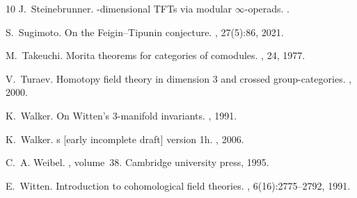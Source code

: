 \documentclass[reqno]{amsart}
\theoremstyle{definition}
\renewcommand{\1}{\mathbf{1}}
\begin{document}
\begin{thebibliography}{10}
J.~Steinebrunner.
-dimensional {TFT}s via modular $\infty$-operads.
.

S.~Sugimoto.
\newblock On the {F}eigin--{T}ipunin conjecture.
, 27(5):86, 2021.

M.~Takeuchi.
\newblock Morita theorems for categories of comodules.
, 24, 1977.

V.~Turaev.
\newblock Homotopy field theory in dimension 3 and crossed group-categories.
, 2000.

K.~Walker.
\newblock On {W}itten's 3-manifold invariants.
, 1991.

K.~Walker.
s [early incomplete draft] version 1h.
, 2006.

C.~A. Weibel.
, volume~38.
\newblock Cambridge university press, 1995.

E.~Witten.
\newblock Introduction to cohomological field theories.
, 6(16):2775--2792, 1991.

\end{thebibliography}
\end{document}
